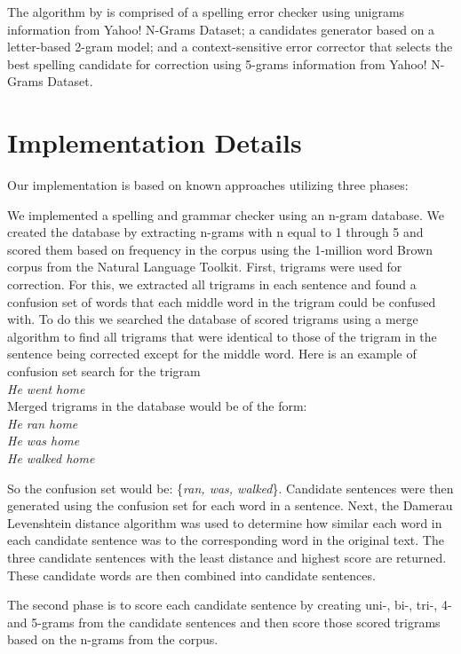 \documentclass[twocolumn]{article}
\newcommand{\tab}{\hspace*{2em}}
\begin{document}
The algorithm by \cite{Bassil12} is comprised of a spelling error checker using unigrams information from Yahoo! N-Grams Dataset; a candidates generator based on a letter-based 2-gram model; and a context-sensitive error corrector that selects the best spelling candidate for correction using 5-grams information from Yahoo! N-Grams Dataset.

\section{Implementation Details}
Our implementation is based on known approaches utilizing three phases:

We implemented a spelling and grammar checker using an n-gram database. We created the database by extracting n-grams with n equal to 1 through 5 and scored them based on frequency in the corpus using the 1-million word Brown corpus from the Natural Language Toolkit.
First, trigrams were used for correction. For this, we extracted all trigrams in  each sentence and found a confusion set of words that each middle word in the trigram could be confused with. To do this we searched the database of scored trigrams using a merge algorithm to find all trigrams that were identical to those of the trigram in the sentence being corrected except for the middle word. Here is an example of confusion set search for the trigram
\\
\newline
\tab\tab\emph{He went home}
\\\newline
Merged trigrams in the database would be of the form:
\\
\tab\tab\emph{He ran home} \\
\tab\tab\emph{He was home} \\
\tab\tab\emph{He walked home}

So the confusion set would be: \{\emph{ran, was, walked}\}. Candidate sentences were then generated using the confusion set for each word in a sentence. Next, the Damerau Levenshtein distance algorithm was used to determine how similar each word in each candidate sentence was to the corresponding word in the original text. The three candidate sentences with the least distance and highest score are returned. These candidate words are then combined into candidate sentences.

The second phase is to score each candidate sentence by creating uni-, bi-, tri-, 4- and 5-grams from the candidate sentences and then score those scored trigrams based on the n-grams from the corpus.
\end{document}
